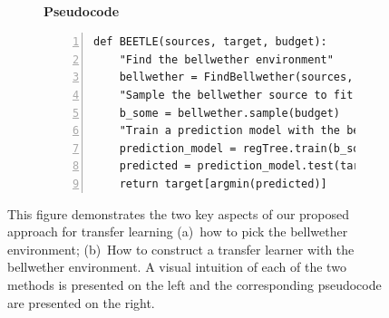 \begin{figure}[htbp]
\begin{subfigure}[t]{0.5\linewidth}
\end{subfigure}~~%
\begin{subfigure}[t]{0.5\linewidth}
\vspace{0.4cm}
\hspace{0.4\linewidth}\textbf{Pseudocode}\\[-0.3cm]
\small
\begin{lstlisting}[xleftmargin=5.0ex,mathescape,frame=none,numbers=left]
def BEETLE(sources, target, budget): 
    "Find the bellwether environment"
    bellwether = FindBellwether(sources, step_size, budget, thres, lives)
    "Sample the bellwether source to fit budget"
    b_some = bellwether.sample(budget)
    "Train a prediction model with the bellwether"
    prediction_model = regTree.train(b_some)
    predicted = prediction_model.test(target.indep)
    return target[argmin(predicted)]
\end{lstlisting}
\end{subfigure}	
\caption{{\small This figure demonstrates the two key aspects of our proposed approach for transfer learning (a)~how to pick the bellwether environment; (b)~How to construct a  transfer learner with the bellwether environment. A visual intuition of each of the two methods is presented on the left and the corresponding pseudocode are presented on the right.}}
\label{fig:approach}
\end{figure}